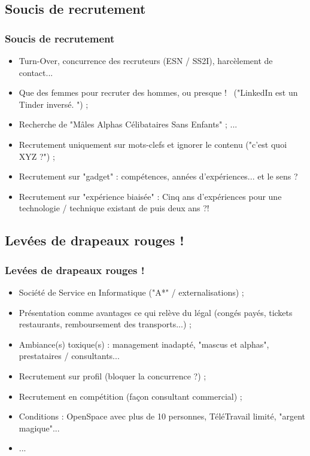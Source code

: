 \documentclass[slidetop,11pt]{beamer}
\begin{document}
\subsection{Soucis de recrutement}
\begin{frame}
	\frametitle{Soucis de recrutement}
	\begin{itemize}
		\item Turn-Over, concurrence des recruteurs (ESN / SS2I), harc{\`e}lement de contact... 
		\item Que des femmes pour recruter des hommes, ou presque !~\newline
		("LinkedIn est un Tinder invers{\'e}. ") ; 
		\item Recherche de "M{\^a}les Alphas C{\'e}libataires Sans Enfants" ; ...
		\item Recrutement uniquement sur mots-clefs et ignorer le contenu ("c'est quoi XYZ ?") ; 
		\item Recrutement sur "gadget" : comp{\'e}tences, ann{\'e}es d'exp{\'e}riences... et le sens ?
		\item Recrutement sur "exp{\'e}rience biais{\'e}e" : Cinq ans d'exp{\'e}riences pour une technologie / technique existant de puis deux ans ?!
	\end{itemize}
\end{frame}

\subsection{Lev{\'e}es de drapeaux rouges !}
\begin{frame}
	\frametitle{Lev{\'e}es de drapeaux rouges !}
	\begin{itemize}
		\item Soci{\'e}t{\'e} de Service en Informatique ("A*" / externalisations) ; 
		\item Pr{\'e}sentation comme avantages ce qui rel{\`e}ve du l{\'e}gal (cong{\'e}s pay{\'e}s, tickets restaurants, remboursement des transports...) ; 
		\item Ambiance(s) toxique(s) : management inadapt{\'e}, "mascus et alphas", prestataires / consultants...
		\item Recrutement sur profil (bloquer la concurrence ?) ; 
		\item Recrutement en comp{\'e}tition (fa\c{c}on consultant commercial) ; 
		\item Conditions : OpenSpace avec plus de 10 personnes, T{\'e}l{\'e}Travail limit{\'e}, "argent magique"...
		\item ... 
	\end{itemize}
\end{frame}
\end{document}
